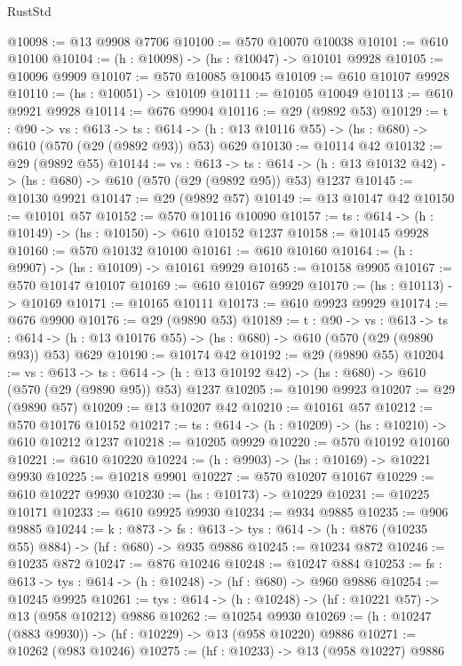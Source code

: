 \begin{lexlean}{RustStd}
\begin{coremodule}
@10098 := @13 @9908 @7706
@10100 := @570 @10070 @10038
@10101 := @610 @10100
@10104 := (h : @10098) -> (hs : @10047) -> @10101 @9928
@10105 := @10096 @9909
@10107 := @570 @10085 @10045
@10109 := @610 @10107 @9928
@10110 := (hs : @10051) -> @10109
@10111 := @10105 @10049
@10113 := @610 @9921 @9928
@10114 := @676 @9904
@10116 := @29 (@9892 @53)
@10129 := {t : @90} ->
  {vs : @613} ->
  {ts : @614} -> (h : @13 @10116 @55) -> (hs : @680) -> @610 (@570 (@29 (@9892 @93)) @53) @629
@10130 := @10114 @42
@10132 := @29 (@9892 @55)
@10144 := {vs : @613} ->
  {ts : @614} -> (h : @13 @10132 @42) -> (hs : @680) -> @610 (@570 (@29 (@9892 @95)) @53) @1237
@10145 := @10130 @9921
@10147 := @29 (@9892 @57)
@10149 := @13 @10147 @42
@10150 := @10101 @57
@10152 := @570 @10116 @10090
@10157 := {ts : @614} -> (h : @10149) -> (hs : @10150) -> @610 @10152 @1237
@10158 := @10145 @9928
@10160 := @570 @10132 @10100
@10161 := @610 @10160
@10164 := (h : @9907) -> (hs : @10109) -> @10161 @9929
@10165 := @10158 @9905
@10167 := @570 @10147 @10107
@10169 := @610 @10167 @9929
@10170 := (hs : @10113) -> @10169
@10171 := @10165 @10111
@10173 := @610 @9923 @9929
@10174 := @676 @9900
@10176 := @29 (@9890 @53)
@10189 := {t : @90} ->
  {vs : @613} ->
  {ts : @614} -> (h : @13 @10176 @55) -> (hs : @680) -> @610 (@570 (@29 (@9890 @93)) @53) @629
@10190 := @10174 @42
@10192 := @29 (@9890 @55)
@10204 := {vs : @613} ->
  {ts : @614} -> (h : @13 @10192 @42) -> (hs : @680) -> @610 (@570 (@29 (@9890 @95)) @53) @1237
@10205 := @10190 @9923
@10207 := @29 (@9890 @57)
@10209 := @13 @10207 @42
@10210 := @10161 @57
@10212 := @570 @10176 @10152
@10217 := {ts : @614} -> (h : @10209) -> (hs : @10210) -> @610 @10212 @1237
@10218 := @10205 @9929
@10220 := @570 @10192 @10160
@10221 := @610 @10220
@10224 := (h : @9903) -> (hs : @10169) -> @10221 @9930
@10225 := @10218 @9901
@10227 := @570 @10207 @10167
@10229 := @610 @10227 @9930
@10230 := (hs : @10173) -> @10229
@10231 := @10225 @10171
@10233 := @610 @9925 @9930
@10234 := @934 @9885
@10235 := @906 @9885
@10244 := {k : @873} ->
  {fs : @613} -> {tys : @614} -> (h : @876 (@10235 @55) @884) -> (hf : @680) -> @935 @9886
@10245 := @10234 @872
@10246 := @10235 @872
@10247 := @876 @10246
@10248 := @10247 @884
@10253 := {fs : @613} -> {tys : @614} -> (h : @10248) -> (hf : @680) -> @960 @9886
@10254 := @10245 @9925
@10261 := {tys : @614} -> (h : @10248) -> (hf : @10221 @57) -> @13 (@958 @10212) @9886
@10262 := @10254 @9930
@10269 := (h : @10247 (@883 @9930)) -> (hf : @10229) -> @13 (@958 @10220) @9886
@10271 := @10262 (@983 @10246)
@10275 := (hf : @10233) -> @13 (@958 @10227) @9886

\end{coremodule}
\end{lexlean}
